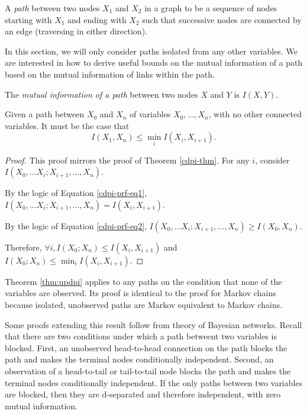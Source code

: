 \documentclass[../thesis.tex]{subfiles}
\begin{document}
\begin{dfn}[Path]
A \emph{path} between two nodes \(X_1\) and \(X_2\) in a graph 
to be a sequence of nodes starting with \(X_1\) and ending with \(X_2\)
such that successive nodes are connected by an edge (traversing
in either direction).
\end{dfn}

In this section, we will only consider paths isolated from
any other variables.
We are interested in how to derive useful bounds on the
mutual information of a path based on the mutual information
of links within the path.

\begin{dfn}
  The \emph{mutual information of a path} between two nodes \(X\) and \(Y\)
  is $I(X,Y)$.
\end{dfn}

\begin{thm}
  \label{thm:updpi}
  Given a path between $X_0$ and $X_n$
  of variables $X_0, ..., X_n$, with no other connected variables.
  It must be the case that
  $$I(X_1,X_n) \leq \min_{i} I(X_i,X_{i+1}).$$
\end{thm}
\begin{proof}
  This proof mirrors the proof of Theorem \ref{cdpi-thm}.
  For any $i$, consider $I(X_0,...X_i;X_{i+1},...,X_n)$.

  By the logic of Equation \ref{cdpi-prf-eq1},
  $I(X_0,...X_i;X_{i+1},...,X_n) = I(X_i,X_{i+1})$.

  By the logic of Equation \ref{cdpi-prf-eq2},
  $I(X_0,...X_i;X_{i+1},...,X_n) \geq I(X_0,X_n)$.

  Therefore, $\forall i, I(X_0;X_n) \leq I(X_i,X_{i+1})$
  and $I(X_0;X_n) \leq \min_i I(X_i,X_{i+1})$.
\end{proof}

Theorem \ref{thm:updpi} applies to any paths on the condition
that none of the variables are observed.
Its proof is identical to the proof for Markov chains because
isolated, unobserved paths are Markov equivalent to Markov chains.

Some proofs extending this result follow from theory of Bayesian
networks. Recall that there are two conditions under which a
path betweent two variables is blocked.
First, an unobserved head-to-head connection on the
path blocks the path and makes the terminal nodes conditionally
independent. Second, an observation of a head-to-tail or tail-to-tail
node blocks the path and makes the terminal nodes conditionally
independent.
If the only paths between two variables are blocked, then they
are d-separated and therefore independent, with zero mutual information.
\end{document}
